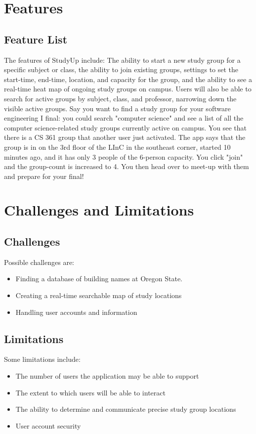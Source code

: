 \documentclass[12pt]{article}
\begin{document}
\section{Features}
\subsection{Feature List}
The features of StudyUp include: The ability to start a new study group for a specific subject or class, the ability to join existing groups, settings to set the start-time, end-time, location, and capacity for the group, and the ability to see a real-time heat map of ongoing study groups on campus. Users will also be able to search for active groups by subject, class, and professor, narrowing down the visible active groups. Say you want to find a study group for your software engineering I final: you could search "computer science" and see a list of all the computer science-related study groups currently active on campus. You see that there is a CS 361 group that another user just activated. The app says that the group is in on the 3rd floor of the LInC in the southeast corner, started 10 minutes ago, and it has only 3 people of the 6-person capacity. You click "join" and the group-count is increased to 4. You then head over to meet-up with them and prepare for your final! 

\section{Challenges and Limitations}
\subsection{Challenges}
Possible challenges are:
\begin{itemize}
\item Finding a database of building names at Oregon State.
\item Creating a real-time searchable map of study locations
\item Handling user accounts and information
\end{itemize}

\subsection{Limitations}
Some limitations include:
\begin{itemize}
\item The number of users the application may be able to support
\item The extent to which users will be able to interact
\item The ability to determine and communicate precise study group locations
\item User account security
\end{itemize}
\end{document}
